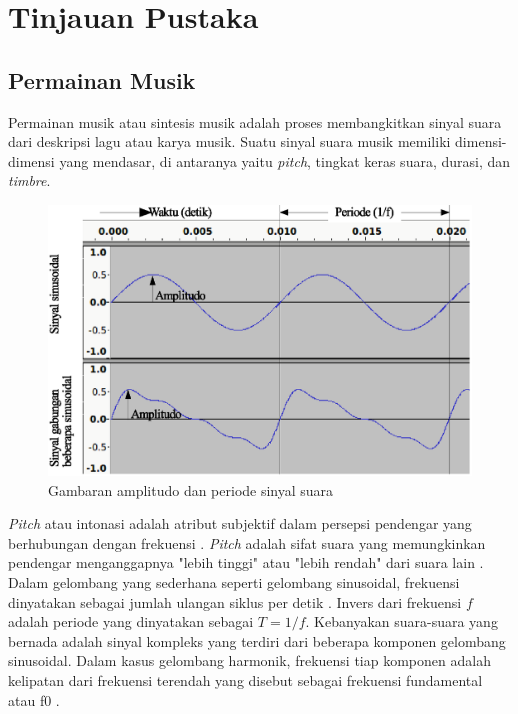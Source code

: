 \chapter{Tinjauan Pustaka}

\section{Permainan Musik}\label{section-music-performance}

Permainan musik atau sintesis musik adalah proses membangkitkan sinyal suara dari deskripsi lagu atau karya musik. Suatu sinyal suara musik memiliki dimensi-dimensi yang mendasar, di antaranya yaitu \textit{pitch}, tingkat keras suara, durasi, dan \textit{timbre}. \parencite{emilia2006tonaldesc}

\begin{figure}[htbp]
    \centering
    \includegraphics[width=\textwidth]{resources/sound-signal-example.eps}
    \caption{Gambaran amplitudo dan periode sinyal suara} \label{soundsignalexample}
\end{figure}

\textit{Pitch} atau intonasi adalah atribut subjektif dalam persepsi pendengar yang berhubungan dengan frekuensi \parencite{emilia2006tonaldesc}. \textit{Pitch} adalah sifat suara yang memungkinkan pendengar menganggapnya "lebih tinggi" atau "lebih rendah" dari suara lain \parencite{pitchneuralcoding}. Dalam gelombang yang sederhana seperti gelombang sinusoidal, frekuensi dinyatakan sebagai jumlah ulangan siklus per detik \parencite{grovedict}. Invers dari frekuensi $f$ adalah periode yang dinyatakan sebagai $T=1/f$. Kebanyakan suara-suara yang bernada adalah sinyal kompleks yang terdiri dari beberapa komponen gelombang sinusoidal. Dalam kasus gelombang harmonik, frekuensi tiap komponen adalah kelipatan dari frekuensi terendah yang disebut sebagai frekuensi fundamental atau f0 \parencite{emilia2006tonaldesc}.

